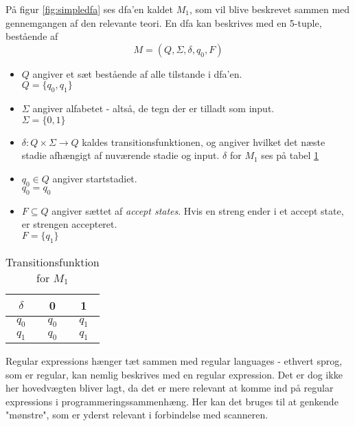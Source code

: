 
\noindent På figur \ref{fig:simpledfa} ses \gls{dfa}'en kaldet $M_1$, som vil blive beskrevet sammen med gennemgangen af den relevante teori. En \gls{dfa} kan beskrives med en 5-tuple, bestående af \[M = (Q, \Sigma, \delta, q_0, F)\]

\begin{itemize}
    \item $Q$ angiver et sæt bestående af alle tilstande i \gls{dfa}'en.\\
        $Q = \{q_0, q_1\}$
    \item $\Sigma$ angiver alfabetet - altså, de tegn der er tilladt som input.\\
        $\Sigma = \{0, 1\}$
    \item $\delta: Q \times \Sigma \rightarrow Q$ kaldes transitionsfunktionen, og angiver hvilket det næste stadie afhængigt af nuværende stadie og input. $\delta$ for $M_1$ ses på tabel \ref{tab:transfunk_m1}
    \item $q_0 \in Q$ angiver startstadiet.\\
        $q_0 = q_0$
    \item $F \subseteq Q$ angiver sættet af \textit{accept states}. Hvis en streng ender i et accept state, er strengen accepteret.\\
        $F = \{q_1\}$
\end{itemize}

\begin{table}[H]
    \centering
        \begin{tabular}{ c|c c }
        \centering
            $\delta$ & 0 & 1\\ \hline 
            $q_0$ & $q_0$ & $q_1$\\
            $q_1$ & $q_0$ & $q_1$\\
        \end{tabular}
    \caption{Transitionsfunktion for $M_1$}
    \label{tab:transfunk_m1}
\end{table}

Regular expressions hænger tæt sammen med regular languages - ethvert sprog, som er regular, kan nemlig beskrives med en regular expression. Det er dog ikke her hovedvægten bliver lagt, da det er mere relevant at komme ind på regular expressions i programmeringssammenhæng. Her kan det bruges til at genkende "mønstre"\mbox{}, som er yderst relevant i forbindelse med scanneren. 

